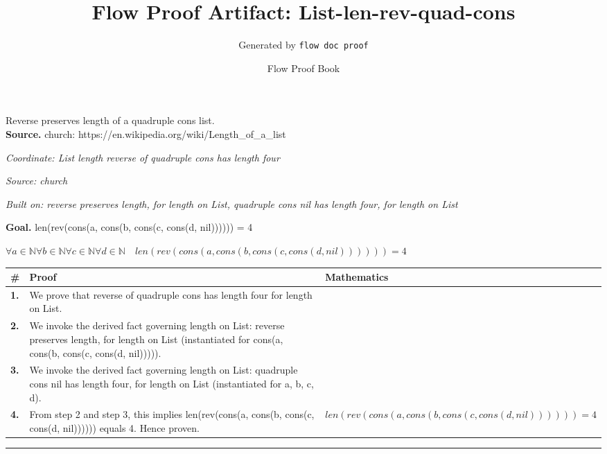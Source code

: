 \documentclass[11pt]{article}
\title{Flow Proof Artifact: List-len-rev-quad-cons}
\author{Generated by \texttt{flow doc proof}}
\date{Flow Proof Book}
\theoremstyle{definition}
\begin{document}
\maketitle
Reverse preserves length of a quadruple cons list.\\[0.5em]
\textbf{Source.} church: https://en.wikipedia.org/wiki/Length\_of\_a\_list\\[0.5em]
\bigskip
{}\par
\smallskip\noindent\textit{Coordinate: List \cdot length \cdot reverse of quadruple cons has length four}\par
\smallskip\noindent\textit{Source: church}\par
\smallskip\noindent\textit{Built on: reverse preserves length, for length on List, quadruple cons nil has length four, for length on List}\par
\medskip
\noindent\textbf{Goal.} len(rev(cons(a, cons(b, cons(c, cons(d, nil)))))) = 4\par
\noindent$\displaystyle \forall a \in \mathbb{N} \forall b \in \mathbb{N} \forall c \in \mathbb{N} \forall d \in \mathbb{N}\quad len(rev(cons(a, cons(b, cons(c, cons(d, nil)))))) = 4$\par
\medskip
\noindent
\begin{tabular}{@{} >{\raggedright\arraybackslash}p{} >{\raggedright\arraybackslash}p{} >{\raggedleft\arraybackslash}p{} @{}}
\textbf{\#} & \textbf{Proof} & \textbf{Mathematics} \\
\midrule
\textbf{1.} & We prove that reverse of quadruple cons has length four for length on List. & \\[0.45em]
\textbf{2.} & We invoke the derived fact governing length on List: reverse preserves length, for length on List (instantiated for cons(a, cons(b, cons(c, cons(d, nil))))). & \\[0.45em]
\textbf{3.} & We invoke the derived fact governing length on List: quadruple cons nil has length four, for length on List (instantiated for a, b, c, d). & \\[0.45em]
\textbf{4.} & From step 2 and step 3, this implies len(rev(cons(a, cons(b, cons(c, cons(d, nil)))))) equals 4. Hence proven. & $\displaystyle len(rev(cons(a, cons(b, cons(c, cons(d, nil)))))) = 4$ \\[0.45em]
\bottomrule
\end{tabular}
\label{thm:List-length-reverse_of_quadruple_cons_has_length_four}
\par\medskip\hrule
\end{document}
